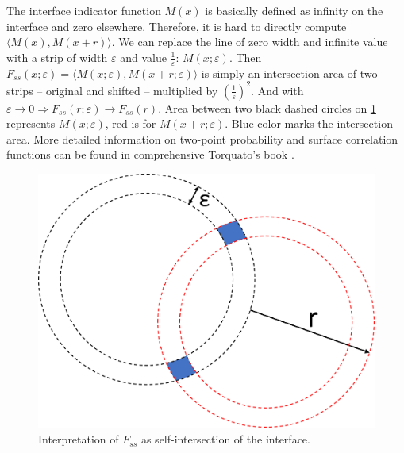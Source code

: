 \documentclass[reprint,amsmath,amssymb,aps,pre,showkeys,showpacs]{revtex4-1}
\begin{document}
The interface indicator function $M(x)$ is basically defined as infinity on the
interface and zero elsewhere. Therefore, it is hard to directly compute
$\langle M(x), M(x + r) \rangle$. We can replace the line of zero width and infinite value
with a strip of width $\varepsilon$ and value $\frac{1}{\varepsilon}$: $M(x; \varepsilon)$.
Then $F_{ss}(x; \varepsilon) = \langle M(x; \varepsilon), M(x + r; \varepsilon) \rangle$
is simply an intersection area of two strips -- original and shifted --
multiplied by $(\frac{1}{\varepsilon})^2$.
And with $\varepsilon \to 0 \Rightarrow F_{ss}(r; \varepsilon) \to F_{ss}(r)$.
Area between two black dashed circles on \cref{fig:Fss-explained} represents
$M(x; \varepsilon)$, red is for $M(x + r; \varepsilon)$. Blue color marks the
intersection area. More detailed information on two-point probability and
surface correlation functions can be found in comprehensive Torquato's book
\cite{Torquato_book}.

\begin{figure}
  \centering
  \includegraphics[width=\linewidth]{images/Fss.png}
  \caption[]{Interpretation of $F_{ss}$ as self-intersection of the interface.}
  \label{fig:Fss-explained}
\end{figure}
\end{document}
